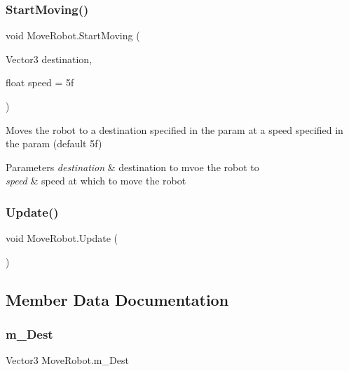 \subsubsection{\texorpdfstring{Start\+Moving()}{StartMoving()}}
{\footnotesize\ttfamily void Move\+Robot.\+Start\+Moving (\begin{DoxyParamCaption}\item[{Vector3}]{destination,  }\item[{float}]{speed = {\ttfamily 5f} }\end{DoxyParamCaption})}



Moves the robot to a destination specified in the param at a speed specified in the param (default 5f) 


\begin{DoxyParams}{Parameters}
{\em destination} & destination to mvoe the robot to\\
\hline
{\em speed} & speed at which to move the robot\\
\hline
\end{DoxyParams}
\mbox{\label{class_move_robot_a358d1401815e59ddae6edca2f7874b88}} 
\subsubsection{\texorpdfstring{Update()}{Update()}}
{\footnotesize\ttfamily void Move\+Robot.\+Update (\begin{DoxyParamCaption}{ }\end{DoxyParamCaption})\hspace{0.3cm}{\ttfamily [private]}}



\subsection{Member Data Documentation}
\mbox{\label{class_move_robot_a67cd9847aff3dc2e26cbb9cf3f27ab12}} 
\subsubsection{\texorpdfstring{m\+\_\+\+Dest}{m\_Dest}}
{\footnotesize\ttfamily Vector3 Move\+Robot.\+m\+\_\+\+Dest\hspace{0.3cm}{\ttfamily [private]}}

